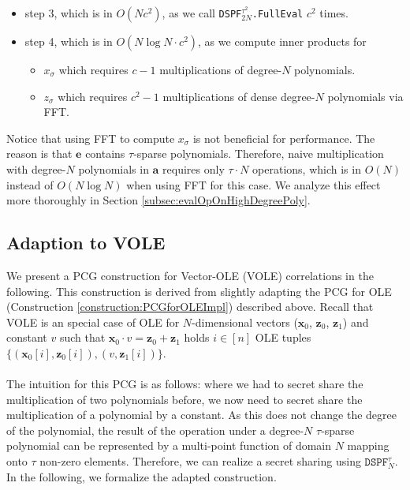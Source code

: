 \begin{itemize}
\item step 3, which is in $O(Nc^2)$, as we call \texttt{DSPF$^{\tau^2}_{2N}$.FullEval} $c^2$ times.
\item step 4, which is in $O(N\log N \cdot c^2)$, as we compute inner products for
\begin{itemize}
\item $x_{\sigma}$ which requires $c-1$ multiplications of degree-$N$ polynomials.
\item $z_{\sigma}$ which requires $c^2-1$ multiplications of dense degree-$N$ polynomials via FFT.
\end{itemize}
\end{itemize}

Notice that using FFT to compute $x_{\sigma}$ is not beneficial for performance. The reason is that $\boldsymbol{e}$ contains $\tau$-sparse polynomials. Therefore, naive multiplication with degree-$N$ polynomials in $\boldsymbol{a}$ requires only $\tau\cdot N$ operations, which is in $O(N)$ instead of $O(N\log N)$ when using FFT for this case. We analyze this effect more thoroughly in Section \ref{subsec:evalOpOnHighDegreePoly}.

\subsection{Adaption to VOLE}
We present a PCG construction for Vector-OLE (VOLE) correlations in the following. This construction is derived from slightly adapting the PCG for OLE (Construction \ref{construction:PCGforOLEImpl}) described above. Recall that VOLE is an special case of OLE for $N$-dimensional vectors ($\mathbf{x}_0$, $\mathbf{z}_0$, $\mathbf{z}_1$) and constant $v$ such that $\mathbf{x}_0\cdot v = \mathbf{z}_0 + \mathbf{z}_1$ holds $i \in [n]$ OLE tuples $\{(\mathbf{x}_0[i], \mathbf{z}_0[i]),(v, \mathbf{z}_1[i])\}$. 
\\\\
The intuition for this PCG is as follows: where we had to secret share the multiplication of two polynomials before, we now need to secret share the multiplication of a polynomial by a constant. As this does not change the degree of the polynomial, the result of the operation under a degree-$N$ $\tau$-sparse polynomial can be represented by a multi-point function of domain $N$ mapping onto $\tau$ non-zero elements. Therefore, we can realize a secret sharing using $\texttt{DSPF}^{\tau}_{N}$. In the following, we formalize the adapted construction.

